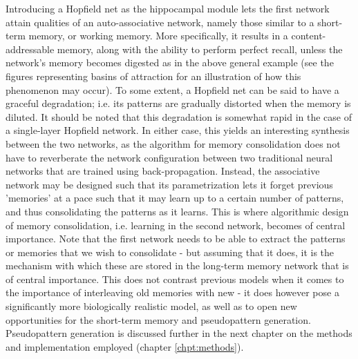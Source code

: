 Introducing a Hopfield net as the hippocampal module lets the first network attain qualities of an auto-associative network, namely those similar to a short-term memory, or working memory. More specifically, it results in a content-addressable memory, along with the ability to perform perfect recall, unless the network's memory becomes digested as in the above general example (see the figures representing basins of attraction for an illustration of how this phenomenon may occur).
To some extent, a Hopfield net can be said to have a graceful degradation; i.e. its patterns are gradually distorted when the memory is diluted. It should be noted that this degradation is somewhat rapid in the case of a single-layer Hopfield network. In either case, this yields an interesting synthesis between the two networks, as the algorithm for memory consolidation does not have to reverberate the network configuration between two traditional neural networks that are trained using back-propagation. Instead, the associative network may be designed such that its parametrization lets it forget previous 'memories' at a pace such that it may learn up to a certain number of patterns, and thus consolidating the patterns as it learns. This is where algorithmic design of memory consolidation, i.e. learning in the second network, becomes of central importance. Note that the first network needs to be able to extract the patterns or memories that we wish to consolidate - but assuming that it does, it is the mechanism with which these are stored in the long-term memory network that is of central importance. This does not contrast previous models when it comes to the importance of interleaving old memories with new - it does however pose a significantly more biologically realistic model, as well as to open new opportunities for the short-term memory and pseudopattern generation. Pseudopattern generation is discussed further in the next chapter on the methods and implementation employed (chapter \ref{chpt:methods}).

